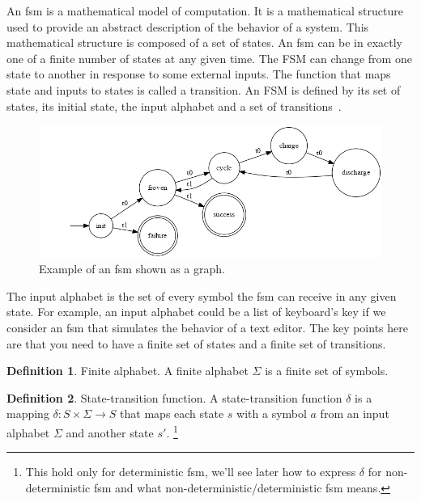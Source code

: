 \documentclass[12pt]{article}
\theoremstyle{definition}
\newtheorem{definition}{Definition}[section]
\theoremstyle{definition}
\theoremstyle{remark}
\begin{document}

An \gls{fsm} is a mathematical model of computation. It is a mathematical structure used to provide an abstract description of the behavior of a system. This mathematical structure is composed of a set of states. An \gls{fsm} can be in exactly one of a finite number of states at any given time. The FSM can change from one state to another in response to some external inputs. The function that maps state and inputs to states is called a transition. An FSM is defined by its set of states, its initial state, the input alphabet and a set of transitions~\cite{FSM:2017}.\\

\begin{figure}[H]
    \centering
    \includegraphics[scale=0.4]{graph/BatteryCycle.png}
    \caption{Example of an \gls{fsm} shown as a graph.}
    \label{battcycle}
\end{figure}

The input alphabet is the set of every symbol the \gls{fsm} can receive in any given state. For example, an input alphabet could be a list of keyboard's key if we consider an \gls{fsm} that simulates the behavior of a text editor. The key points here are that you need to have a finite set of states and a finite set of transitions.\\

\theoremstyle{definition}
\begin{definition}{Finite alphabet.} A finite alphabet $\Sigma$ is a finite set of symbols.
\end{definition}

\theoremstyle{definition}
\begin{definition}{State-transition function.} A state-transition function $\delta$ is a mapping $\delta:S\times \Sigma \rightarrow S$ that maps each state $s$ with a symbol $a$ from an input alphabet $\Sigma$ and another state $s'$.
\footnote{This hold only for deterministic \gls{fsm}, we'll see later how to express $\delta$ for non-deterministic \gls{fsm} and what non-deterministic/deterministic \gls{fsm} means.}
\end{definition}
\end{document}
